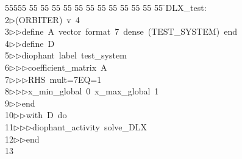 %
%
\begin{tabbing}
55555 \= 55 \= 55 \= 55 \= 55 \= 55 \= 55 \= 55 \= 55 \= 55 \= 55 \= 55 \= 55 \= \>DLX\_test:\\[0pt]
2\>$\triangleright$\>(ORBITER)\ v\ 4\ \\[0pt]
3\>$\triangleright$\>$\triangleright$\>define\ A\ vector\ format\ 7\ dense\ (TEST\_SYSTEM)\ end\ \\[0pt]
4\>$\triangleright$\>$\triangleright$\>define\ D\ \\[0pt]
5\>$\triangleright$\>$\triangleright$\>diophant\ label\ test\_system\ \\[0pt]
6\>$\triangleright$\>$\triangleright$\>$\triangleright$\>coefficient\_matrix\ A\ \\[0pt]
7\>$\triangleright$\>$\triangleright$\>$\triangleright$\>RHS\ mult=7EQ=1\ \\[0pt]
8\>$\triangleright$\>$\triangleright$\>$\triangleright$\>x\_min\_global\ 0\ x\_max\_global\ 1\ \\[0pt]
9\>$\triangleright$\>$\triangleright$\>end\ \\[0pt]
10\>$\triangleright$\>$\triangleright$\>with\ D\ do\ \\[0pt]
11\>$\triangleright$\>$\triangleright$\>$\triangleright$\>diophant\_activity\ solve\_DLX\ \\[0pt]
12\>$\triangleright$\>$\triangleright$\>end\\[0pt]
13\>\end{tabbing}
